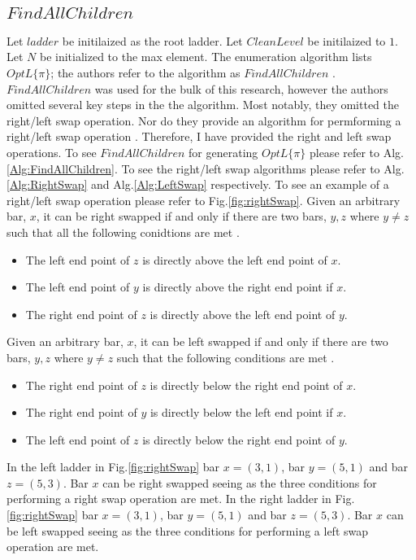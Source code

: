 \subsection{$FindAllChildren$}

Let $ladder$ be initilaized as the root ladder. Let $CleanLevel$ be initilaized to $1$. 
Let $N$ be initialized to the max element. The enumeration algorithm 
lists $OptL\{\pi\}$; the authors refer to the algorithm as $FindAllChildren$ \cite{A1}. 
$FindAllChildren$ was used for the bulk of this research, however 
the authors omitted several key steps in the the algorithm. Most notably, they 
omitted the right/left swap operation. Nor do they provide an algorithm 
for permforming a right/left swap operation \cite{A1}. Therefore, I have provided 
the right and left swap operations.
To see $FindAllChildren$ for generating $OptL\{\pi\}$ please refer to Alg.\ref{Alg:FindAllChildren}.
 To see the right/left swap algorithms please 
refer to Alg.\ref{Alg:RightSwap} and Alg.\ref{Alg:LeftSwap} respectively. To 
see an example of a right/left swap operation please refer to Fig.\ref{fig:rightSwap}.
Given an arbitrary bar, $x$, it can be right swapped if and only if there are two bars, $y,z$ where $y \neq z$ 
such that all the following conidtions are met \cite{A1}.
\begin{itemize}
	\item The left end point of $z$ is directly above the left end point of $x$.
	\item The left end point of $y$ is directly above the right end point if $x$.
	\item The right end point of $z$ is directly above the left end point of $y$.
\end{itemize}

Given an arbitrary bar, $x$, it can be left swapped if and only if there are two bars, $y,z$ where $y \neq z$ 
such that the following conditions are met \cite{A1}.
\begin{itemize}
	\item The right end point of $z$ is directly below the right end point of $x$.
	\item The right end point of $y$ is directly below the left end point if $x$.
	\item The left end point of $z$ is directly below the right end point of $y$.
\end{itemize}
In the left ladder in Fig.\ref{fig:rightSwap} bar $x=(3,1)$, bar $y=(5,1)$ and bar $z=(5,3)$. Bar $x$ can be right swapped 
seeing as the three conditions for performing a right swap operation are met.
In the right ladder in Fig.\ref{fig:rightSwap} bar $x=(3,1)$, bar $y=(5,1)$ and bar $z=(5,3)$. Bar $x$ can be left swapped 
seeing as the three conditions for performing a left swap operation are met.


